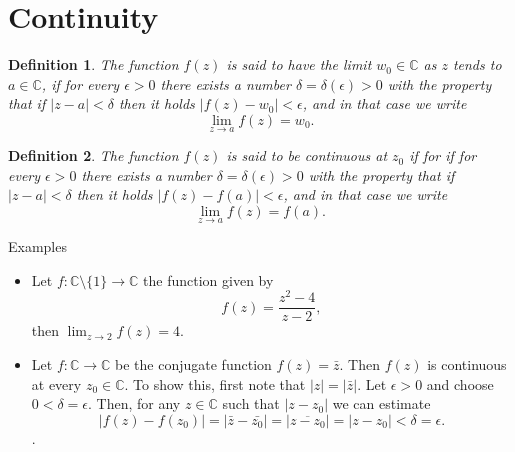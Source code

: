 \documentclass{amsart}
\newtheorem{mydef}{Definition}
\begin{document}
\section{Continuity}
\label{sec:org01a1087}
\begin{mydef}
The function \(f(z)\) is said to have the limit \(w_0\in \mathbb{C}\) as \(z\) tends to \(a\in\mathbb{C}\),  if for every \(\epsilon >0\) there exists a number \(\delta = \delta(\epsilon) >0\) with the property that if \(|z - a| < \delta\) then it holds \(|f(z) - w_0| <\epsilon\), and in that case we write \[ \lim_{z\to a} f(z) = w_0 . \]
\end{mydef}


\begin{mydef}
The function \(f(z)\) is said to be continuous at \(z_0\) if for if for every \(\epsilon >0\) there exists a number \(\delta = \delta(\epsilon) >0\) with the property that if \(|z - a| < \delta\) then it holds \(|f(z) - f(a)| <\epsilon\), and in that case we write \[ \lim_{z\to a} f(z) = f(a) . \]
\end{mydef}

\alert{Examples}
\begin{itemize}
\item Let \(f:\mathbb{C}\setminus\{1\} \to \mathbb{C}\) the function given by \[f(z) =\dfrac{z^2 - 4}{z - 2}, \] then \(\lim_{z\to 2} f(z) = 4\).

\item Let \(f:\mathbb{C} \to \mathbb{C}\) be the conjugate function \(f(z) = \bar{z}\). Then \(f(z)\) is continuous at every \(z_0\in \mathbb{C}\). To show this, first note that \(|z| = |\bar{z}|\). Let \(\epsilon >0\) and choose \(0< \delta = \epsilon\). Then, for any \(z\in \mathbb{C}\) such that \(|z-z_0|\) we can estimate \[ |f(z) - f(z_0)| = |\bar{z} - \bar{z_0}|=|\overline{z - z_0}| = |z- z_0| < \delta = \epsilon.\].
\end{itemize}
\end{document}
